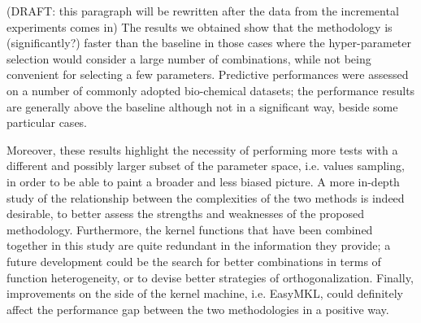 
(DRAFT: this paragraph will be rewritten after the data from the incremental experiments comes in)
The results we obtained show that the methodology is (significantly?) faster than the baseline
in those cases where the hyper-parameter selection would consider a large number of 
combinations, while not being convenient for selecting a few parameters.
Predictive performances were assessed on a number of commonly adopted bio-chemical
datasets; the performance results are generally above the baseline although not in a
significant way, beside some particular cases.


Moreover, these results highlight the necessity of performing more 
tests with a different and possibly larger subset of the parameter space, i.e.
values sampling, in order to be able to paint a broader and less biased picture.
A more in-depth study of the relationship between the complexities of
the two methods is indeed desirable, to better assess the strengths and weaknesses
of the proposed methodology.
Furthermore, the kernel functions that have been combined together in this study
are quite redundant in the information they provide; a future development could
be the search for better combinations in terms of function heterogeneity,
or to devise better strategies of orthogonalization.
Finally, improvements on the side of the kernel machine, i.e. EasyMKL, could definitely
affect the performance gap between the two methodologies in a positive way.


